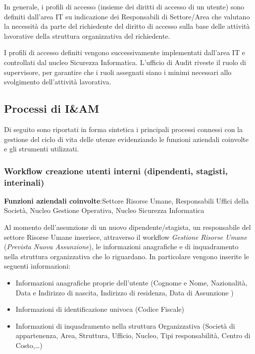 In generale, i profili di accesso (insieme dei diritti di accesso di un
utente) sono definiti dall'area IT su indicazione dei
Responsabili di Settore/Area che valutano la necessit\`a da parte del
richiedente del diritto di accesso sulla base delle attivit\`a
lavorative della struttura organizzativa del richiedente. 

I profili di accesso definiti vengono successivamente implementati
dall'area IT e controllati dal nucleo Sicurezza
Informatica. L'ufficio di Audit riveste il ruolo di
supervisore, per garantire che i ruoli assegnati siano i minimi
necessari allo svolgimento dell'attivit\`a lavorativa.


\subsection{Processi di I\&AM}

Di seguito sono riportati in forma sintetica i principali processi
connessi con la gestione del ciclo di vita delle utenze evidenziando le
funzioni aziendali coinvolte e gli strumenti utilizzati.

\subsubsection{Workflow creazione utenti interni (dipendenti, stagisti,
interinali)}


\textbf{Funzioni aziendali coinvolte}:Settore Risorse Umane,
Responsabili Uffici della Societ\`a, Nucleo Gestione Operativa, Nucleo Sicurezza
Informatica

Al momento dell'assunzione di un nuovo
dipendente/stagista, un responsabile del settore Risorse Umane
inserisce, attraverso il workflow \textit{Gestione Risorse Umane}
(\textit{Prevista Nuova Assunzione}), le informazioni anagrafiche e di
inquadramento nella struttura organizzativa che lo riguardano. In
particolare vengono inserite le seguenti informazioni:

\begin{itemize}
\item Informazioni anagrafiche proprie
dell'utente (Cognome e Nome, Nazionalit\`a, Data e
Indirizzo di nascita, Indirizzo di residenza, Data di Assunzione )
\item Informazioni di identificazione univoca (Codice Fiscale)
\item Informazioni di inquadramento nella struttura
Organizzativa (Societ\`a di appartenenza, Area, Struttura, Ufficio,
Nucleo, Tipi responsabilit\`a, Centro di Costo,\dots)
\end{itemize}

